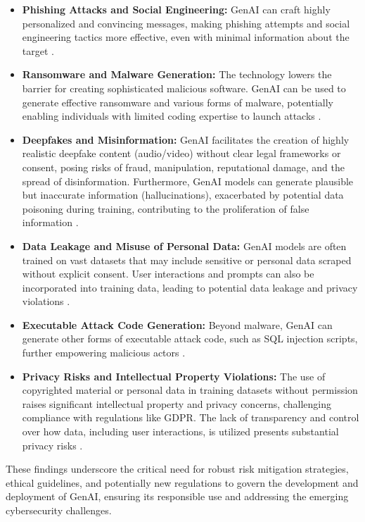 \begin{itemize}
    \item \textbf{Phishing Attacks and Social Engineering:} GenAI can craft highly personalized and convincing messages, making phishing attempts and social engineering tactics more effective, even with minimal information about the target \cite{nyoto_cyber_2024}.
    \item \textbf{Ransomware and Malware Generation:} The technology lowers the barrier for creating sophisticated malicious software. GenAI can be used to generate effective ransomware and various forms of malware, potentially enabling individuals with limited coding expertise to launch attacks \cite{nyoto_cyber_2024}.
    \item \textbf{Deepfakes and Misinformation:} GenAI facilitates the creation of highly realistic deepfake content (audio/video) without clear legal frameworks or consent, posing risks of fraud, manipulation, reputational damage, and the spread of disinformation. Furthermore, GenAI models can generate plausible but inaccurate information (hallucinations), exacerbated by potential data poisoning during training, contributing to the proliferation of false information \cite{nyoto_cyber_2024}.
    \item \textbf{Data Leakage and Misuse of Personal Data:} GenAI models are often trained on vast datasets that may include sensitive or personal data scraped without explicit consent. User interactions and prompts can also be incorporated into training data, leading to potential data leakage and privacy violations \cite{nyoto_cyber_2024}.
    \item \textbf{Executable Attack Code Generation:} Beyond malware, GenAI can generate other forms of executable attack code, such as SQL injection scripts, further empowering malicious actors \cite{nyoto_cyber_2024}.
    \item \textbf{Privacy Risks and Intellectual Property Violations:} The use of copyrighted material or personal data in training datasets without permission raises significant intellectual property and privacy concerns, challenging compliance with regulations like GDPR. The lack of transparency and control over how data, including user interactions, is utilized presents substantial privacy risks \cite{nyoto_cyber_2024}.
\end{itemize}

These findings underscore the critical need for robust risk mitigation strategies, ethical guidelines, and potentially new regulations to govern the development and deployment of GenAI, ensuring its responsible use and addressing the emerging cybersecurity challenges.

